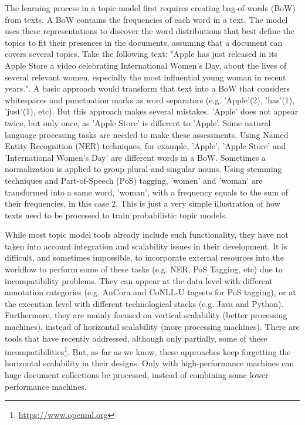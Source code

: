 The learning process in a topic model first requires creating bag-of-words (BoW) from texts. A BoW contains the frequencies of each word in a text. The model uses these representations to discover the word distributions that best define the topics to fit their presences in the documents, assuming that a document can covers several topics. Take the following text: "Apple has just released in its Apple Store a video celebrating International Women's Day, about the lives of several relevant women, especially the most influential young woman in recent years.". A basic approach would transform that text into a BoW that considers whitespaces and punctuation marks as word separators (e.g. 'Apple'(2), 'has'(1), 'just'(1), etc). But this approach makes several mistakes. 'Apple' does not appear twice, but only once, as 'Apple Store' is different to 'Apple'. Some natural language processing tasks are needed to make these assessments. Using Named Entity Recognition (NER) techniques, for example,  'Apple', 'Apple Store' and 'International Women's Day' are different words in a BoW. Sometimes a normalization is applied to group plural and singular nouns. Using stemming techniques and Part-of-Speech (PoS) tagging, 'women' and 'woman' are transformed into a same word, 'woman', with a frequency equals to the sum of their frequencies, in this case 2. This is just a very simple illustration of how texts need to be processed to train probabilistic topic models. 

While most topic model tools already include such functionality, they have not taken into account integration and scalability issues in their development. It is difficult, and sometimes impossible, to incorporate external resources into the workflow to perform some of these tasks (e.g. NER, PoS Tagging, etc) due to incompatibility problems. They can appear at the data level with different annotation categories (e.g. AnCora and CoNLL-U tagsets for PoS tagging), or at the execution level with different technological stacks (e.g. Java and Python). Furthermore, they are mainly focused on vertical scalability (better processing machines), instead of horizontal scalability (more processing machines). There are tools that have recently addressed, although only partially, some of these incompatibilities\footnote{\url{https://www.openml.org}}. But, as far as we know, these approaches keep forgetting the horizontal scalability in their designs. Only with high-performance machines can huge document collections be processed, instead of combining some lower-performance machines.

